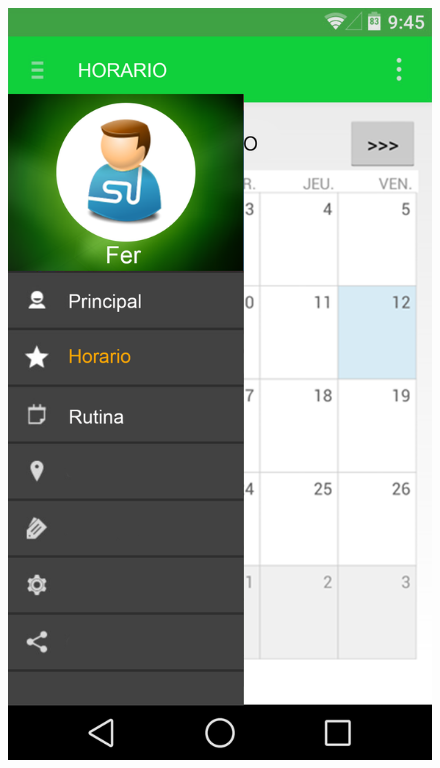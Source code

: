 \documentclass[../pfc.tex]{subfiles}
\begin{document}
	\begin{figure}
\centering
\includegraphics[width=0.7\linewidth]{../images/drawer}
\caption{}
\label{fig:drawer}
\end{figure}

	
		
	
		

		
	
\end{document}
